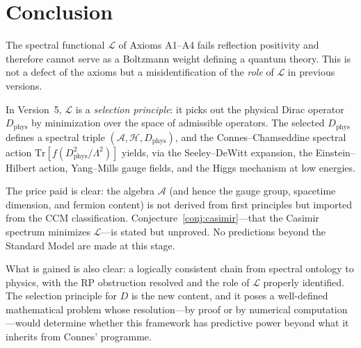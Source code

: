 \documentclass[12pt]{article}
\theoremstyle{definition}
\theoremstyle{remark}
\newcommand{\Tr}{\mathrm{Tr}}
\begin{document}
\section{Conclusion}
\label{sec:conclusion}

The spectral functional $\mathcal{L}$ of Axioms A1--A4 fails reflection
positivity and therefore cannot serve as a Boltzmann weight defining a
quantum theory.  This is not a defect of the axioms but a
misidentification of the \emph{role} of $\mathcal{L}$ in previous
versions.

In Version~5, $\mathcal{L}$ is a \emph{selection principle}:
it picks out the physical Dirac operator $D_{\mathrm{phys}}$ by
minimization over the space of admissible operators.
The selected $D_{\mathrm{phys}}$ defines a spectral triple
$(\mathcal{A},\mathcal{H},D_{\mathrm{phys}})$, and the
Connes--Chamseddine spectral action
$\Tr[f(D_{\mathrm{phys}}^2/\Lambda^2)]$ yields, via the
Seeley--DeWitt expansion, the Einstein--Hilbert action, Yang--Mills
gauge fields, and the Higgs mechanism at low energies.

The price paid is clear: the algebra $\mathcal{A}$ (and hence the
gauge group, spacetime dimension, and fermion content) is not derived
from first principles but imported from the CCM classification.
Conjecture~\ref{conj:casimir}---that the Casimir spectrum minimizes
$\mathcal{L}$---is stated but unproved.
No predictions beyond the Standard Model are made at this stage.

What is gained is also clear: a logically consistent chain from
spectral ontology to physics, with the RP obstruction resolved
and the role of $\mathcal{L}$ properly identified.  The selection
principle for $D$ is the new content, and it poses a well-defined
mathematical problem whose resolution---by proof or by numerical
computation---would determine whether this framework has
predictive power beyond what it inherits from Connes' programme.
\end{document}
